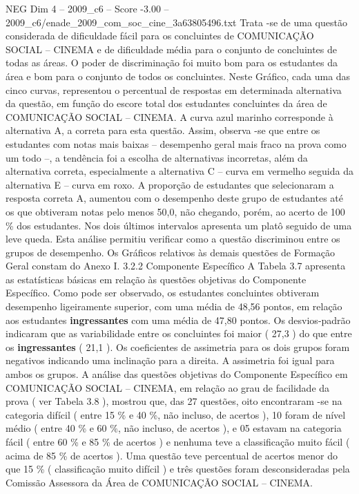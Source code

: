 \begin{textsample}{NEG Dim 4 – 2009\_c6 – Score -3.00 – 2009\_c6/enade\_2009\_com\_soc\_cine\_3a63805496.txt}
Trata -se de uma questão considerada de dificuldade fácil para os concluintes de COMUNICAÇÃO SOCIAL – CINEMA e de dificuldade média para o conjunto de concluintes de todas as áreas.
O poder de discriminação foi muito bom para os estudantes da área e bom para o conjunto de todos os concluintes.
Neste Gráfico, cada uma das cinco curvas, representou o percentual de respostas em determinada alternativa da questão, em função do escore total dos estudantes concluintes da área de COMUNICAÇÃO SOCIAL – CINEMA.
A curva azul marinho corresponde à alternativa A, a correta para esta questão.
Assim, observa -se que entre os estudantes com notas mais baixas – desempenho geral mais fraco na prova como um todo –, a tendência foi a escolha de alternativas incorretas, além da alternativa correta, especialmente a alternativa C – curva em vermelho seguida da alternativa E – curva em roxo.
A proporção de estudantes que selecionaram a resposta correta A, aumentou com o desempenho deste grupo de estudantes até os que obtiveram notas pelo menos 50,0, não chegando, porém, ao acerto de 100 \% dos estudantes.
Nos dois últimos intervalos apresenta um platô seguido de uma leve queda.
Esta análise permitiu verificar como a questão discriminou entre os grupos de desempenho.
Os Gráficos relativos às demais questões de Formação Geral constam do Anexo I. 3.2.2 Componente Específico A Tabela 3.7 apresenta as estatísticas básicas em relação às questões objetivas do Componente Específico.
Como pode ser observado, os estudantes concluintes obtiveram desempenho ligeiramente superior, com uma média de 48,56 pontos, em relação aos estudantes \textbf{ingressantes} com uma média de 47,80 pontos.
Os desvios-padrão indicaram que as variabilidade entre os concluintes foi maior ( 27,3 ) do que entre os \textbf{ingressantes} ( 21,1 ).
Os coeficientes de assimetria para os dois grupos foram negativos indicando uma inclinação para a direita.
A assimetria foi igual para ambos os grupos.
A análise das questões objetivas do Componente Específico em COMUNICAÇÃO SOCIAL – CINEMA, em relação ao grau de facilidade da prova ( ver Tabela 3.8 ), mostrou que, das 27 questões, oito encontraram -se na categoria difícil ( entre 15 \% e 40 \%, não incluso, de acertos ), 10 foram de nível médio ( entre 40 \% e 60 \%, não incluso, de acertos ), e 05 estavam na categoria fácil ( entre 60 \% e 85 \% de acertos ) e nenhuma teve a classificação muito fácil ( acima de 85 \% de acertos ).
Uma questão teve percentual de acertos menor do que 15 \% ( classificação muito difícil ) e três questões foram desconsideradas pela Comissão Assessora da Área de COMUNICAÇÃO SOCIAL – CINEMA.

\end{textsample}
